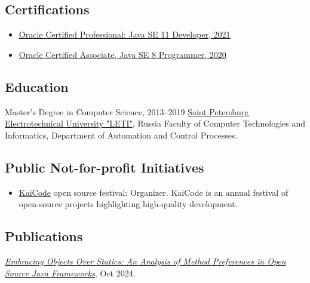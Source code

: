 \documentclass{vl}
\begin{document}
    \subsection*{Certifications}

    \begin{itemize}
        \itemsep0em
        \item \href{https://catalog-education.oracle.com/pls/certview/sharebadge?id=87F6A2FE819A5A5AF4120A05900AB28A461EE9A3EE9FBFA02721FADAEB3BCE19}{Oracle Certified Professional: Java SE 11 Developer, 2021}
        \item \href{https://www.credly.com/badges/e2d9ddda-20dc-433d-8ab7-18548fd0fd8f/public_url}{Oracle Certified Associate, Java SE 8 Programmer, 2020}
    \end{itemize}

    \subsection*{Education}
    \begin{samepage}
        Master's Degree in Computer Science, 2013--2019\newline
        \href{https://etu.ru/en/university/}{Saint Petersburg Electrotechnical University "LETI"}, Russia\newline
        Faculty of Computer Technologies and Informatics, Department of Automation and Control Processes.
    \end{samepage}

    \subsection*{Public Not-for-profit Initiatives}
    \begin{itemize}
        \item \href{https://www.kaicode.org}{KaiCode} open source festival: Organizer.
        KaiCode is an annual festival of open-source projects highlighting high-quality development.
    \end{itemize}

    \subsection*{Publications}
    \begin{samepage}
        \emph{\href{https://arxiv.org/abs/2410.05631}{Embracing Objects Over Statics: An Analysis of Method Preferences
        in Open Source Java Frameworks}}, Oct 2024.
    \end{samepage}
\end{document}
